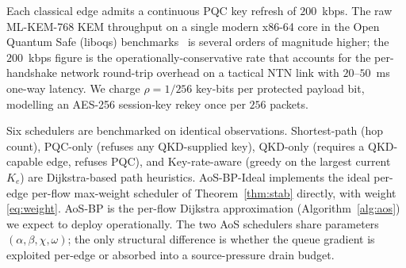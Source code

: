 \documentclass[conference]{IEEEtran}
\begin{document}
Each classical edge admits a continuous PQC key refresh of
$200$~kbps.  The raw ML-KEM-768 KEM throughput on a single modern
x86-64 core in the Open Quantum Safe (liboqs)
benchmarks~\cite{liboqs_2020} is several orders of magnitude higher;
the $200$~kbps figure is the operationally-conservative rate that
accounts for the per-handshake network round-trip overhead on a
tactical NTN link with $20$--$50$~ms one-way latency.  We charge
$\rho=1/256$ key-bits per protected payload bit, modelling an
AES-256 session-key rekey once per $256$ packets.

Six schedulers are benchmarked on identical observations.
Shortest-path (hop count), PQC-only (refuses any QKD-supplied key),
QKD-only (requires a QKD-capable edge, refuses PQC), and
Key-rate-aware (greedy on the largest current $K_e$) are
Dijkstra-based path heuristics.  AoS-BP-Ideal implements the ideal
per-edge per-flow max-weight scheduler of Theorem~\ref{thm:stab}
directly, with weight \eqref{eq:weight}.  AoS-BP is the per-flow
Dijkstra approximation (Algorithm~\ref{alg:aos}) we expect to deploy
operationally.  The two AoS schedulers share parameters
$(\alpha,\beta,\chi,\omega)$; the only structural difference is
whether the queue gradient is exploited per-edge or absorbed into a
source-pressure drain budget.
\end{document}
